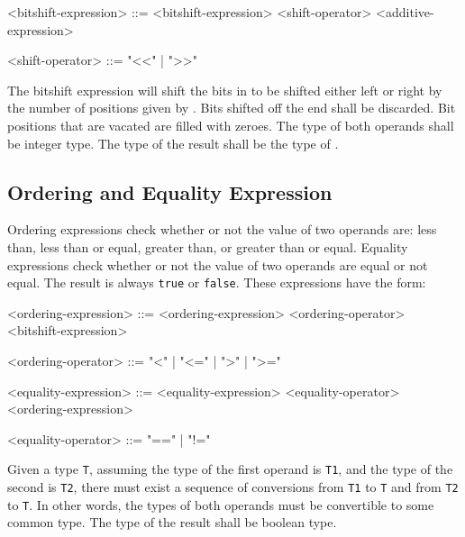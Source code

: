 \begin{minip}
\begin{grammar}
<bitshift-expression> ::= <bitshift-expression> 
<shift-operator> <additive-expression>

<shift-operator> ::= "<<" | ">>"
\end{grammar}
\end{minip}

The bitshift expression will shift the bits in  to be shifted either left or right by the number of positions given by . Bits shifted off the end shall be discarded. Bit positions that are vacated are filled with zeroes. The type of both operands shall be integer type. The type of the result shall be the type of .

\subsection{Ordering and Equality Expression} \label{ordering_expr_guide}

Ordering expressions check whether or not the value of two operands are: less than, less than or equal, greater than, or greater than or equal. Equality expressions check whether or not the value of two operands are equal or not equal. The result is always \texttt{true} or \texttt{false}. These expressions have the form: 

\begin{minip}
\begin{grammar}
<ordering-expression> ::= <ordering-expression> 
<ordering-operator> <bitshift-expression>

<ordering-operator> ::= "<" | "<=" | ">" | ">="

<equality-expression> ::= <equality-expression>
<equality-operator> <ordering-expression>

<equality-operator> ::= "==" | "!="
\end{grammar}
\end{minip}

Given a type \texttt{T}, assuming the type of the first operand is \texttt{T1}, and the type of the second is \texttt{T2}, there must exist a sequence of conversions from \texttt{T1} to \texttt{T} and from \texttt{T2} to \texttt{T}. In other words, the types of both operands must be convertible to some common type. The type of the result shall be boolean type.

